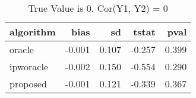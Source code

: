 \begin{table}[h!]
\caption{True Value is 0. Cor(Y1, Y2) = 0}
\centering
\begin{tabular}[t]{lrrrr}
\toprule
algorithm & bias & sd & tstat & pval\\
\midrule
oracle & -0.001 & 0.107 & -0.257 & 0.399\\
ipworacle & -0.002 & 0.150 & -0.554 & 0.290\\
proposed & -0.001 & 0.121 & -0.339 & 0.367\\
\bottomrule
\end{tabular}
\end{table}
